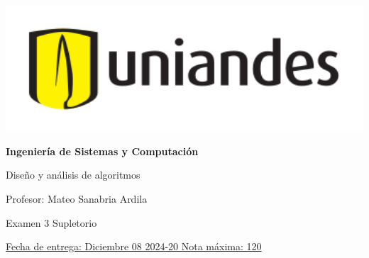 \documentclass[12pt, a4paper]{exam}
\begin{document}
	\noindent
	\begin{minipage}[l]{0.1\textwidth}
		\noindent
		\includegraphics[width=1.8\textwidth]{Logosimbolo-uniandes_horizontal.png}
	\end{minipage}
\hfill
\begin{minipage}[c]{0.8\textwidth}
	\begin{center}
		{\large \textbf{Ingeniería de Sistemas y Computación} \par
		\large	Diseño y análisis de algoritmos	\par
		\small  Profesor: Mateo Sanabria Ardila	\par
		\small  Examen 3	Supletorio \par
		}
	\end{center}
\end{minipage}
\par
\vspace{0.2in}
\noindent
\uline{Fecha de entrega: Diciembre 08 	\hfill  2024-20		\hfill Nota máxima: 120}
\par 
\vspace{0.15in}
\end{document}
